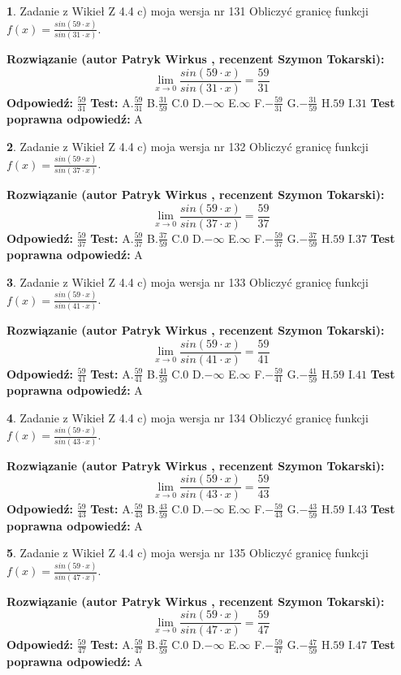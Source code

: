\documentclass[12pt, a4paper]{article}
\theoremstyle{definition} %
\newtheorem{zad}{}
\newcommand{\zadStart}[1]{\begin{zad}#1\newline}
\newcommand{\zadStop}{\end{zad}}
\newcommand{\rozwStart}[2]{\noindent \textbf{Rozwiązanie (autor #1 , recenzent #2): }\newline}
\newcommand{\rozwStop}{\newline}
\newcommand{\odpStart}{\noindent \textbf{Odpowiedź:}\newline}
\newcommand{\odpStop}{\newline}
\newcommand{\testStart}{\noindent \textbf{Test:}\newline}
\newcommand{\testStop}{\newline}
\newcommand{\kluczStart}{\noindent \textbf{Test poprawna odpowiedź:}\newline}
\newcommand{\kluczStop}{\newline}
\begin{document}
\zadStart{Zadanie z Wikieł Z 4.4 c) moja wersja nr 131}
Obliczyć granicę funkcji $f(x)=\frac{sin(59\cdot x)}{sin(31\cdot x)}$.
\zadStop
\rozwStart{Patryk Wirkus}{Szymon Tokarski}
$$\lim\limits_{x\to 0}\frac{sin(59\cdot x)}{sin(31\cdot x)}=
\frac{59}{31}$$
\rozwStop
\odpStart
$\frac{59}{31}$
\odpStop
\testStart
A.$\frac{59}{31}$
B.$\frac{31}{59}$
C.$0$
D.$-\infty$
E.$\infty$
F.$-\frac{59}{31}$
G.$-\frac{31}{59}$
H.$59$
I.$31$
\testStop
\kluczStart
A
\kluczStop



\zadStart{Zadanie z Wikieł Z 4.4 c) moja wersja nr 132}
Obliczyć granicę funkcji $f(x)=\frac{sin(59\cdot x)}{sin(37\cdot x)}$.
\zadStop
\rozwStart{Patryk Wirkus}{Szymon Tokarski}
$$\lim\limits_{x\to 0}\frac{sin(59\cdot x)}{sin(37\cdot x)}=
\frac{59}{37}$$
\rozwStop
\odpStart
$\frac{59}{37}$
\odpStop
\testStart
A.$\frac{59}{37}$
B.$\frac{37}{59}$
C.$0$
D.$-\infty$
E.$\infty$
F.$-\frac{59}{37}$
G.$-\frac{37}{59}$
H.$59$
I.$37$
\testStop
\kluczStart
A
\kluczStop



\zadStart{Zadanie z Wikieł Z 4.4 c) moja wersja nr 133}
Obliczyć granicę funkcji $f(x)=\frac{sin(59\cdot x)}{sin(41\cdot x)}$.
\zadStop
\rozwStart{Patryk Wirkus}{Szymon Tokarski}
$$\lim\limits_{x\to 0}\frac{sin(59\cdot x)}{sin(41\cdot x)}=
\frac{59}{41}$$
\rozwStop
\odpStart
$\frac{59}{41}$
\odpStop
\testStart
A.$\frac{59}{41}$
B.$\frac{41}{59}$
C.$0$
D.$-\infty$
E.$\infty$
F.$-\frac{59}{41}$
G.$-\frac{41}{59}$
H.$59$
I.$41$
\testStop
\kluczStart
A
\kluczStop



\zadStart{Zadanie z Wikieł Z 4.4 c) moja wersja nr 134}
Obliczyć granicę funkcji $f(x)=\frac{sin(59\cdot x)}{sin(43\cdot x)}$.
\zadStop
\rozwStart{Patryk Wirkus}{Szymon Tokarski}
$$\lim\limits_{x\to 0}\frac{sin(59\cdot x)}{sin(43\cdot x)}=
\frac{59}{43}$$
\rozwStop
\odpStart
$\frac{59}{43}$
\odpStop
\testStart
A.$\frac{59}{43}$
B.$\frac{43}{59}$
C.$0$
D.$-\infty$
E.$\infty$
F.$-\frac{59}{43}$
G.$-\frac{43}{59}$
H.$59$
I.$43$
\testStop
\kluczStart
A
\kluczStop



\zadStart{Zadanie z Wikieł Z 4.4 c) moja wersja nr 135}
Obliczyć granicę funkcji $f(x)=\frac{sin(59\cdot x)}{sin(47\cdot x)}$.
\zadStop
\rozwStart{Patryk Wirkus}{Szymon Tokarski}
$$\lim\limits_{x\to 0}\frac{sin(59\cdot x)}{sin(47\cdot x)}=
\frac{59}{47}$$
\rozwStop
\odpStart
$\frac{59}{47}$
\odpStop
\testStart
A.$\frac{59}{47}$
B.$\frac{47}{59}$
C.$0$
D.$-\infty$
E.$\infty$
F.$-\frac{59}{47}$
G.$-\frac{47}{59}$
H.$59$
I.$47$
\testStop
\kluczStart
A
\kluczStop
\end{document}
